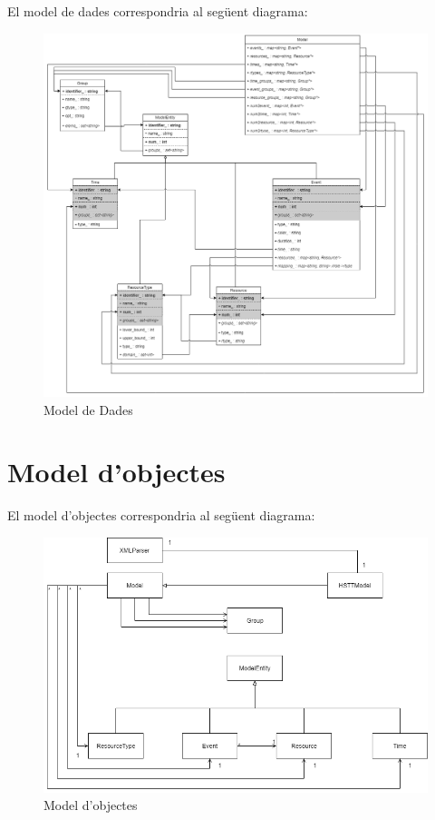 \documentclass[11pt,a4paper,twoside]{report}
\begin{document}
  El model de dades correspondria al següent diagrama:
  \begin{figure}[h!]
    \includegraphics[width=\textwidth]{Diagrames/ModelDades.png}
    \caption{Model de Dades}
    \label{fig:DataModel}
  \end{figure}

  \section{Model d'objectes}

  El model d'objectes correspondria al següent diagrama:
  \begin{figure}[h!]
    \includegraphics[width=\textwidth]{Diagrames/UMLKai.png}
    \caption{Model d'objectes}
    \label{fig:ObjectModel}
  \end{figure}
  
\end{document}
